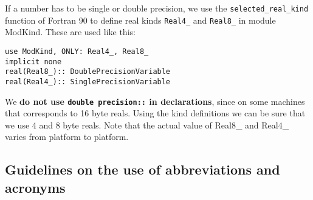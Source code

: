 \documentclass{article}
\begin{document}
If a number has to be single or double precision, we use
the {\tt selected\_real\_kind} function of Fortran 90 to define 
real kinds {\tt Real4\_} and {\tt Real8\_} in module ModKind.
These are used like this:
\begin{verbatim}
use ModKind, ONLY: Real4_, Real8_
implicit none
real(Real8_):: DoublePrecisionVariable
real(Real4_):: SinglePrecisionVariable
\end{verbatim}
We {\bf do not use {\tt double precision::} in declarations}, 
since on some machines that corresponds to 16 byte reals.
Using the kind definitions we can be sure that we use 4 and 8 byte reals.
Note that the actual value of Real8\_ and Real4\_ varies from 
platform to platform.
 

\subsection{Guidelines on the use of abbreviations and acronyms}
\end{document}
